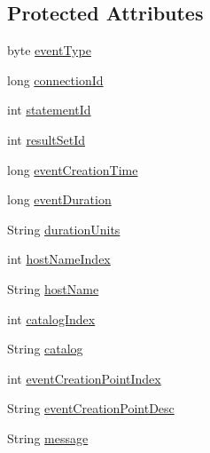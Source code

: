 \subsection*{Protected Attributes}
\begin{DoxyCompactItemize}
\item 
byte \mbox{\hyperlink{classcom_1_1mysql_1_1jdbc_1_1profiler_1_1_profiler_event_ad6b8f61f050154e78ff191693d24f577}{event\+Type}}
\item 
long \mbox{\hyperlink{classcom_1_1mysql_1_1jdbc_1_1profiler_1_1_profiler_event_a445919f2e674d2b75c42a8a2456ea0e7}{connection\+Id}}
\item 
int \mbox{\hyperlink{classcom_1_1mysql_1_1jdbc_1_1profiler_1_1_profiler_event_af5386e1f6681fdf030b5f693dec2440c}{statement\+Id}}
\item 
int \mbox{\hyperlink{classcom_1_1mysql_1_1jdbc_1_1profiler_1_1_profiler_event_a76097357910684be9b8701f2a111c60f}{result\+Set\+Id}}
\item 
long \mbox{\hyperlink{classcom_1_1mysql_1_1jdbc_1_1profiler_1_1_profiler_event_a4ab76316294a2846c1b2a83cd696d6cf}{event\+Creation\+Time}}
\item 
long \mbox{\hyperlink{classcom_1_1mysql_1_1jdbc_1_1profiler_1_1_profiler_event_a16e398a98262c89723022a8ab19974c4}{event\+Duration}}
\item 
String \mbox{\hyperlink{classcom_1_1mysql_1_1jdbc_1_1profiler_1_1_profiler_event_a4a5e45fb47ae2f11e5fddd7257feebda}{duration\+Units}}
\item 
int \mbox{\hyperlink{classcom_1_1mysql_1_1jdbc_1_1profiler_1_1_profiler_event_adb4c0134fce273867141693f1e169751}{host\+Name\+Index}}
\item 
String \mbox{\hyperlink{classcom_1_1mysql_1_1jdbc_1_1profiler_1_1_profiler_event_ab10bb00ac3fe47677ad5b2ce225a9e44}{host\+Name}}
\item 
int \mbox{\hyperlink{classcom_1_1mysql_1_1jdbc_1_1profiler_1_1_profiler_event_a236836f572b2a3a603fc49b57a38afe9}{catalog\+Index}}
\item 
String \mbox{\hyperlink{classcom_1_1mysql_1_1jdbc_1_1profiler_1_1_profiler_event_aa7004cee55f006e0666c602f1a5b07bc}{catalog}}
\item 
int \mbox{\hyperlink{classcom_1_1mysql_1_1jdbc_1_1profiler_1_1_profiler_event_a2ceb21aa4ab02ac62487f70bbbd23bb9}{event\+Creation\+Point\+Index}}
\item 
String \mbox{\hyperlink{classcom_1_1mysql_1_1jdbc_1_1profiler_1_1_profiler_event_a8ff1cab51f5065edb91a8d9f364decca}{event\+Creation\+Point\+Desc}}
\item 
String \mbox{\hyperlink{classcom_1_1mysql_1_1jdbc_1_1profiler_1_1_profiler_event_aec15467b3a256046f8402f3a086ce70d}{message}}
\end{DoxyCompactItemize}


